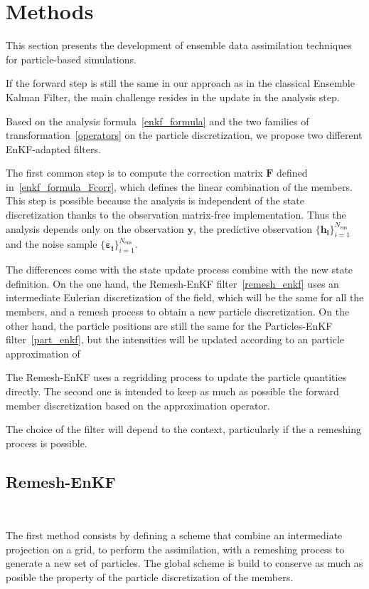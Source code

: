 
\section{Methods}\label{Methods}

This section presents the development of ensemble data assimilation techniques for particle-based simulations.

If the forward step is still the same in our approach as in the classical Ensemble Kalman Filter, the main challenge resides in the update in the analysis step.

Based on the analysis formula~\ref{enkf_formula} and the two families of transformation~\ref{operators} on the particle discretization, we propose two different EnKF-adapted filters.

The first common step is to compute the correction matrix $\bm{F}$ defined in~\ref{enkf_formula_Fcorr}, which defines the linear combination of the members. This step is possible because the analysis is independent of the state discretization thanks to the observation matrix-free implementation. Thus the analysis depends only on the observation $\bm{y}$, the predictive observation $\{\bm{h_i}\}_{i=1}^{N_{\text{ens}}}$ and the noise sample $\{\bm{\varepsilon_i}\}_{i=1}^{N_{\text{ens}}}$.

The differences come with the state update process combine with the new state definition. On the one hand, the Remesh-EnKF filter~\ref{remesh_enkf} uses an intermediate Eulerian discretization of the field, which will be the same for all the members, and a remesh process to obtain a new particle discretization. On the other hand, the particle positions are still the same for the Particles-EnKF filter~\ref{part_enkf}, but the intensities will be updated according to an particle approximation of

The Remesh-EnKF uses a regridding process to update the particle quantities directly. The second one is intended to keep as much as possible the forward member discretization based on the approximation operator.

The choice of the filter will depend to the context, particularly if the a remeshing process is possible.
\subsection{Remesh-EnKF}~\label{remesh_enkf}


The first method consists by defining a scheme that combine an intermediate projection on a grid, to perform the assimilation, with a remeshing process to generate a new set of particles. The global scheme is build to conserve as much as posible the property of the particle discretization of the members.


